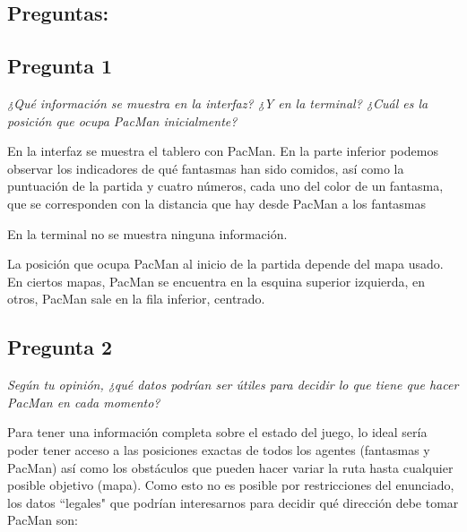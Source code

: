 \documentclass[12pt]{article}
\begin{document}
\tableofcontents

\newpage

\begin{center}
\section{Preguntas:}

\subsection{Pregunta 1}

\emph{¿Qué información se muestra en la interfaz? ¿Y en la terminal? ¿Cuál es la
posición que ocupa PacMan inicialmente?}\\
\end{center}

En la interfaz se muestra el tablero con PacMan. En la parte inferior podemos
observar los indicadores de qué fantasmas han sido comidos, así como la
puntuación de la partida y cuatro números, cada uno del color de un fantasma,
que se corresponden con la distancia que hay desde PacMan a los fantasmas

En la terminal no se muestra ninguna información.

La posición que ocupa PacMan al inicio de la partida depende del mapa usado. En
ciertos mapas, PacMan se encuentra en la esquina superior izquierda, en otros,
PacMan sale en la fila inferior, centrado.


\newpage
\begin{center}
\subsection{Pregunta 2}

\emph{Según tu opinión, ¿qué datos podrían ser útiles para decidir lo que tiene
que hacer PacMan en cada momento?}
\end{center}

Para tener una información completa sobre el estado del juego, lo ideal sería
poder tener acceso a las posiciones exactas de todos los agentes (fantasmas y
PacMan) así como los obstáculos que pueden hacer variar la ruta hasta cualquier
posible objetivo (mapa). Como esto no es posible por restricciones del
enunciado, los datos ``legales" que podrían interesarnos para decidir qué
dirección debe tomar PacMan son:
\end{document}
